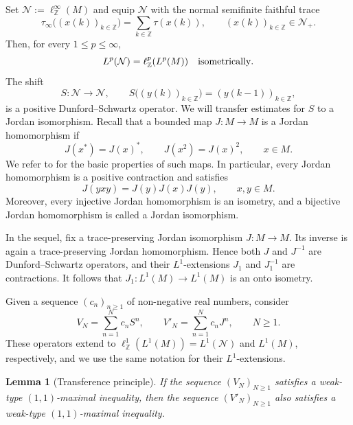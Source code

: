 \documentclass[12pt]{amsart}
\newtheorem{lemma}[theorem]{Lemma}
\theoremstyle{remark}
\theoremstyle{definition}
\numberwithin{equation}{section}
\begin{document}
Set
\(\mathcal N:=\ell^\infty_{\mathbb Z}(M)
\)
and equip $\mathcal N$ with the normal semifinite faithful trace
\begin{equation}\label{2Tau-Infty}
\tau_\infty\bigl((x(k))_{k\in\mathbb Z}\bigr)
=\sum_{k\in\mathbb Z}\tau(x(k)),
\qquad (x(k))_{k\in\mathbb Z}\in\mathcal N_+.
\end{equation}
Then, for every $1\leq p\leq\infty$,
\[
L^p(\mathcal N)=\ell^p_{\mathbb Z}(L^p(M))
\quad\hbox{isometrically}.
\]
The shift
\[
S\colon\mathcal N\to\mathcal N,\qquad
S\bigl((y(k))_{k\in\mathbb Z}\bigr)
=(y(k-1))_{k\in\mathbb Z},
\]
is a positive Dunford--Schwartz operator. We will transfer estimates for $S$ to a Jordan isomorphism. Recall that a bounded map $J\colon M\to M$ is a Jordan homomorphism if
\[
J(x^*)=J(x)^*,\qquad J(x^2)=J(x)^2,\qquad x\in M.
\]
We refer to \cite{HOS} for the basic properties of such maps. In particular, every Jordan homomorphism is a positive contraction and satisfies
\begin{equation}\label{3Jordan}
J(yxy)=J(y)J(x)J(y),\qquad x,y\in M.
\end{equation}
Moreover, every injective Jordan homomorphism is an isometry, and a bijective Jordan homomorphism is called a Jordan isomorphism.

In the sequel, fix a trace-preserving Jordan isomorphism
\(J\colon M\to M.
\)
Its inverse is again a trace-preserving Jordan homomorphism. Hence both $J$ and $J^{-1}$ are Dunford--Schwartz operators, and their $L^1$-extensions $J_1$ and $J_1^{-1}$ are contractions. It follows that
\(J_1\colon L^1(M)\to L^1(M)\)
is an onto isometry.

Given a sequence $(c_n)_{n\ge1}$ of non-negative real numbers, consider
\[
V_N=\sum_{n=1}^N c_nS^n,
\qquad
V'_N=\sum_{n=1}^N c_nJ^n,
\qquad N\ge1.
\]
These operators extend to $\ell^1_{\mathbb Z}(L^1(M))=L^1(\mathcal N)$ and $L^1(M)$, respectively, and we use the same notation for their $L^1$-extensions.

\begin{lemma}[Transference principle]\label{lem:transference}
If the sequence $(V_N)_{N\ge1}$ satisfies a weak-type $(1,1)$-maximal inequality, then the sequence $(V'_N)_{N\ge1}$ also satisfies a weak-type $(1,1)$-maximal inequality.
\end{lemma}
\end{document}
